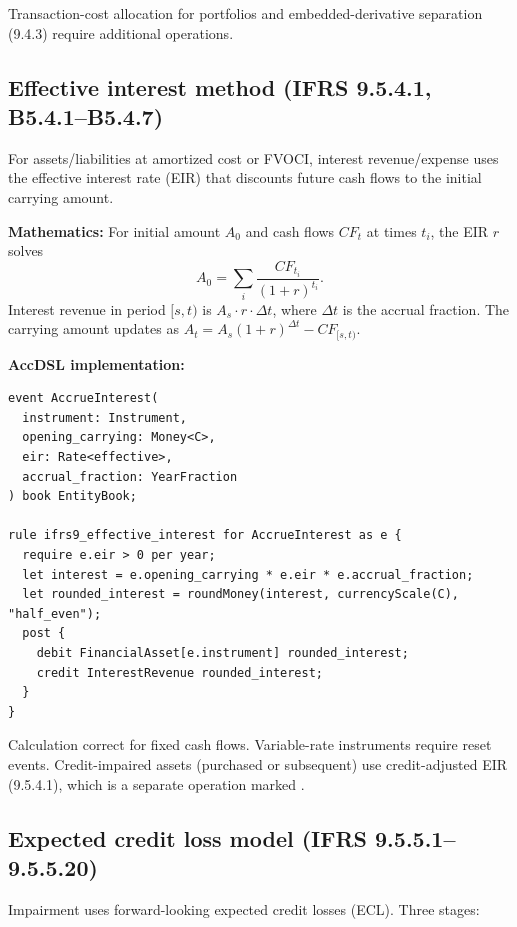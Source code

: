  Transaction-cost allocation for portfolios
and embedded-derivative separation (9.4.3) require additional operations.

\subsection{Effective interest method (IFRS 9.5.4.1, B5.4.1--B5.4.7)}

For assets/liabilities at amortized cost or FVOCI, interest revenue/expense uses
the effective interest rate (EIR) that discounts future cash flows to the initial
carrying amount.

\textbf{Mathematics:} For initial amount $A_0$ and cash flows $CF_t$ at times $t_i$,
the EIR $r$ solves
\begin{equation}
A_0 = \sum_{i} \frac{CF_{t_i}}{(1+r)^{t_i}}.
\end{equation}
Interest revenue in period $[s,t)$ is $A_s \cdot r \cdot \Delta t$, where $\Delta t$
is the accrual fraction. The carrying amount updates as $A_t = A_s(1+r)^{\Delta t} - CF_{[s,t)}$.

\textbf{AccDSL implementation:}

\begin{lstlisting}
event AccrueInterest(
  instrument: Instrument,
  opening_carrying: Money<C>,
  eir: Rate<effective>,
  accrual_fraction: YearFraction
) book EntityBook;

rule ifrs9_effective_interest for AccrueInterest as e {
  require e.eir > 0 per year;
  let interest = e.opening_carrying * e.eir * e.accrual_fraction;
  let rounded_interest = roundMoney(interest, currencyScale(C), "half_even");
  post {
    debit FinancialAsset[e.instrument] rounded_interest;
    credit InterestRevenue rounded_interest;
  }
}
\end{lstlisting}

 Calculation correct for fixed cash flows. Variable-rate
instruments require reset events. Credit-impaired assets (purchased or subsequent)
use credit-adjusted EIR (9.5.4.1), which is a separate operation marked .

\subsection{Expected credit loss model (IFRS 9.5.5.1--9.5.5.20)}

Impairment uses forward-looking expected credit losses (ECL). Three stages:

